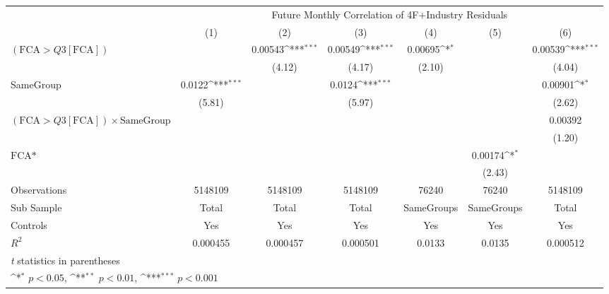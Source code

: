 {
\def\sym#1{\ifmmode^{#1}\else\(^{#1}\)\fi}
\begin{tabular}{l*{6}{c}}
\hline\hline
                &\multicolumn{6}{c}{Future Monthly Correlation of 4F+Industry Residuals}                                          \\\cmidrule(lr){2-7}
                &\multicolumn{1}{c}{(1)}         &\multicolumn{1}{c}{(2)}         &\multicolumn{1}{c}{(3)}         &\multicolumn{1}{c}{(4)}         &\multicolumn{1}{c}{(5)}         &\multicolumn{1}{c}{(6)}         \\
\hline
 $ (\text{FCA} > Q3[\text{FCA}]) $ &                  &  0.00543\sym{***}&  0.00549\sym{***}&  0.00695\sym{*}  &                  &  0.00539\sym{***}\\
                &                  &   (4.12)         &   (4.17)         &   (2.10)         &                  &   (4.04)         \\
[1em]
SameGroup       &   0.0122\sym{***}&                  &   0.0124\sym{***}&                  &                  &  0.00901\sym{*}  \\
                &   (5.81)         &                  &   (5.97)         &                  &                  &   (2.62)         \\
[1em]
 $ (\text{FCA} > Q3[\text{FCA}]) \times  {\text{SameGroup} }  $ &                  &                  &                  &                  &                  &  0.00392         \\
                &                  &                  &                  &                  &                  &   (1.20)         \\
[1em]
$ \text{FCA*} $ &                  &                  &                  &                  &  0.00174\sym{*}  &                  \\
                &                  &                  &                  &                  &   (2.43)         &                  \\
\hline
Observations    &  5148109         &  5148109         &  5148109         &    76240         &    76240         &  5148109         \\
Sub Sample      &    Total         &    Total         &    Total         &SameGroups         &SameGroups         &    Total         \\
Controls        &      Yes         &      Yes         &      Yes         &      Yes         &      Yes         &      Yes         \\
$ R^2 $         & 0.000455         & 0.000457         & 0.000501         &   0.0133         &   0.0135         & 0.000512         \\
\hline\hline
\multicolumn{7}{l}{\footnotesize \textit{t} statistics in parentheses}\\
\multicolumn{7}{l}{\footnotesize \sym{*} \(p<0.05\), \sym{**} \(p<0.01\), \sym{***} \(p<0.001\)}\\
\end{tabular}
}
